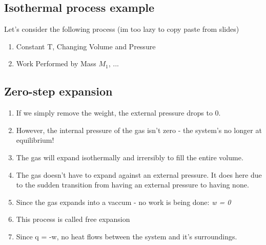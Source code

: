 \documentclass{article}  %
\begin{document}
\subsection*{Isothermal process example}
Let's consider the following process (im too lazy to copy paste from slides)
\begin{enumerate}
    \item Constant T, Changing Volume and Pressure 
    \item Work Performed by Mass $M_1$, ... %
\end{enumerate}

\subsection*{Zero-step expansion}
\begin{enumerate}
    \item If we simply remove the weight, the external pressure drops to 0.
    \item However, the internal pressure of the gas isn't zero - the system's no longer at equilibrium!
    \item The gas will expand isothermally and irrersibly to fill the entire volume. 
    \item The gas doesn't have to expand against an external pressure. It does here due to the sudden transition from having an external pressure to having none. 
    \item Since the gas expands into a vaccum - no work is being done: \emph{w =  0}
    \item This process is called free expansion
    \item Since q = -w, no heat flows between the system and it's surroundings.
\end{enumerate}
\end{document}
